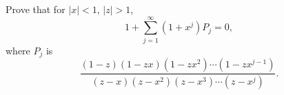 Prove that for $|x| < 1$, $|z| > 1$,
\[
1 + \sum_{j=1}^\infty (1 + x^j)P_j = 0,
\]
where $P_j$ is
\[
\frac{(1 - z)(1 - zx)(1 - zx^2) \cdots (1 - zx^{j-1})}
{(z - x)(z - x^2)(z - x^3) \cdots (z - x^j)}.
\]
